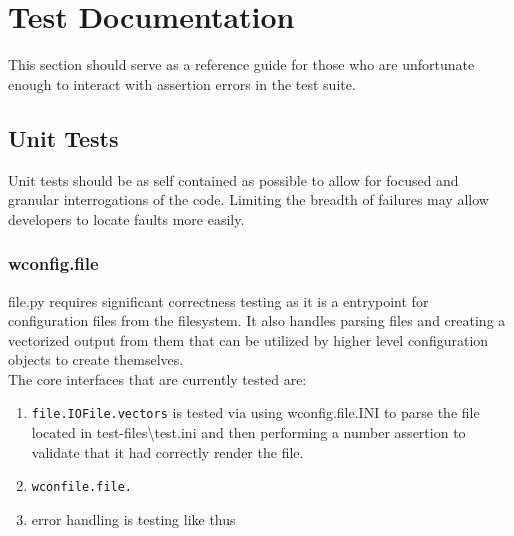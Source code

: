 \documentclass{article}
\newcommand{\monospaced}[1]{\colorbox{light-gray}{\texttt{#1}}}
\begin{document}


\section{Test Documentation}
This section should serve as a reference guide for those who are unfortunate enough to interact with assertion errors in the test suite.

\subsection{Unit Tests}
Unit tests should be as self contained as possible to allow for focused and granular interrogations of the code. Limiting the breadth of failures may allow developers to locate faults more easily.

\subsubsection{wconfig.file}
file.py requires significant correctness testing as it is a entrypoint for configuration files from the filesystem. It also handles parsing files and creating a vectorized output from them that can be utilized by higher level configuration objects to create themselves.
\\
The core interfaces that are currently tested are:
\begin{enumerate}
\item \monospaced{file.IOFile.vectors} is tested via using wconfig.file.INI to parse the file located in test-files\textbackslash test.ini and then performing a number assertion to validate that it had correctly render the file.
\item \monospaced{wconfile.file.} 
\item error handling is testing like thus
\end{enumerate}





\end{document}
